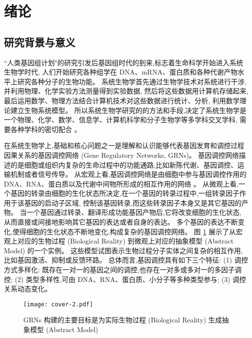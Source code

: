 \section{绪论}
\label{sec:background}

\subsection{研究背景与意义}

``人类基因组计划"的研究引发后基因组时代的到来,标志着生命科学开始进入系统生物学时代,
人们开始研究各种组学在 DNA、mRNA、蛋白质和各种代谢产物水平上研究各种分子的生物功能。
系统生物学首先通过生物学技术对系统进行干涉,并利用物理、化学实验方法测量得到实验数据,
然后将这些数据用计算机存储起来,最后运用数学、物理方法结合计算机技术对这些数据进行统计、分析,
利用数学理论建立生物系统模型。
所以系统生物学研究的的方法和手段,决定了系统生物学是一个物理、化学、数学、信息学、计算机科学和分子生物学等多学科交叉学科,
需要各种学科的密切配合 。

在系统生物学上,基础和核心问题之一是理解和认识能够代表基因发育和调控过程因果关系的基因调控网络 (Gene Regulatory Networks, GRNs)。
基因调控网络描述的是细胞或组织内复杂的生命过程中的功能通路,比如新陈代谢、基因调控、运输机制或者信号传导。
从宏观上看,基因调控网络是由细胞中参与基因调控作用的 DNA、RNA、蛋白质以及代谢中间物所形成的相互作用的网络 。
从微观上看,一个基因的转录由细胞的生化状态所决定,在一个基因的转录过程中,一组转录因子作用于该基因的启动子区域,
控制该基因转录,而这些转录因子本身又是其它基因的产物。
当一个基因通过转录、翻译形成功能基因产物后,它将改变细胞的生化状态,
从而直接或间接地影响其它基因的表达或者自身的表达。
多个基因的表达不断变化,使得细胞的生化状态不断地变化,构成复杂的基因调控网络。
图 \ref{cover-2} 展示了从宏观上对应的生物过程 (Biological Reality) 到微观上对应的抽象模型 (Abstract Model) 的一个实例。
这些模型试图表示生物过程分子实体之间复杂的相互作用,比如基因激活、抑制或反馈环路。
总体而言,基因调控具有如下三个特征: 
(1) 调控方式多样化: 既存在一对一的基因之间的调控,也存在一对多或多对一的多因子调控;
(2) 类型多样性,可由 DNA、RNA、蛋白质、小分子等多种类型参与;
(3) 调控关系动态变化。

\begin{figure}[!htbp]
    \centering
    \texttt{[image: cover-2.pdf]}
    \caption{GRNs 构建的主要目标是为实际生物过程 (Biological Reality) 生成抽象模型 (Abstract Model)
    }
    \label{cover-2}
\end{figure}

